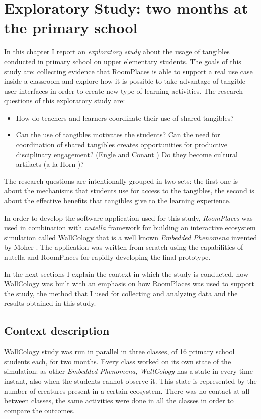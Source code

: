 \chapter{Exploratory Study: two months at the primary school}

\label{chap:user_study}

In this chapter I report an \textit{exploratory study} about the usage of tangibles conducted in primary school on upper elementary students. The goals of this study are: collecting evidence that RoomPlaces is able to support a real use case inside a classroom and explore how it is possible to take advantage of tangible user interfaces in order to create new type of learning activities. The research questions of this exploratory study are:

\begin{itemize}
\item How do teachers and learners coordinate their use of shared tangibles?
\item Can the use of tangibles motivates the students? Can the need for coordination of shared tangibles creates opportunities for productive disciplinary engagement? (Engle and Conant \cite{engle:guiding}) Do they become cultural artifacts (a la Horn \cite{horn:role})?
\end{itemize}

The research questions are intentionally grouped in two sets: the first one is about the mechanisms that students use for access to the tangibles, the second is about the effective benefits that tangibles give to the learning experience.

In order to develop the software application used for this study, \textit{RoomPlaces} was used in combination with \textit{nutella} framework for building an interactive ecosystem simulation called WallCology that is a well known \textit{Embedded Phenomena} invented by Moher \cite{moher:wallcology}. The application was written from scratch using the capabilities of nutella and RoomPlaces for rapidly developing the final prototype.

In the next sections I explain the context in which the study is conducted, how WallCology was built with an emphasis on how RoomPlaces was used to support the study, the method that I used for collecting and analyzing data and the results obtained in this study.

\section{Context description}
WallCology study was run in parallel in three classes, of 16 primary school students each, for two months. Every class worked on its own state of the simulation: as other \textit{Embedded Phenomena}, \textit{WallCology} has a state in every time instant, also when the students cannot observe it. This state is represented by the number of creatures present in a certain ecosystem. There was no contact at all between classes, the same activities were done in all the classes in order to compare the outcomes.

